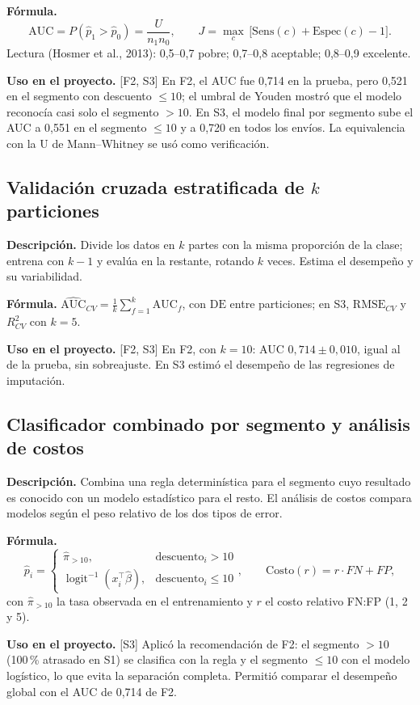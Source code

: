 \documentclass[11pt,a4paper]{article}
\newcommand{\desc}{\textbf{Descripción.} }
\newcommand{\formula}{\textbf{Fórmula.} }
\newcommand{\uso}{\textbf{Uso en el proyecto.} }
\newcommand{\fase}[1]{{\footnotesize\color{gris}[#1]}}
\begin{document}
\formula
\[
\mathrm{AUC}=P(\hat p_{1}>\hat p_{0})=\frac{U}{n_1n_0},\qquad J=\max_c\,\big[\text{Sens}(c)+\text{Espec}(c)-1\big].
\]
Lectura (Hosmer et al., 2013): 0,5--0,7 pobre; 0,7--0,8 aceptable; 0,8--0,9 excelente.

\uso \fase{F2, S3} En F2, el AUC fue 0,714 en la prueba, pero 0,521 en el segmento con descuento $\le10$; el umbral de Youden mostró que el modelo reconocía casi solo el segmento $>10$. En S3, el modelo final por segmento sube el AUC a 0,551 en el segmento $\le10$ y a 0,720 en todos los envíos. La equivalencia con la U de Mann--Whitney se usó como verificación.

\subsection{Validación cruzada estratificada de $k$ particiones}
\desc Divide los datos en $k$ partes con la misma proporción de la clase; entrena con $k-1$ y evalúa en la restante, rotando $k$ veces. Estima el desempeño y su variabilidad.

\formula $\widehat{\mathrm{AUC}}_{CV}=\frac1k\sum_{f=1}^k\mathrm{AUC}_f$, con $\mathrm{DE}$ entre particiones; en S3, $\mathrm{RMSE}_{CV}$ y $R^2_{CV}$ con $k=5$.

\uso \fase{F2, S3} En F2, con $k=10$: AUC $0{,}714\pm0{,}010$, igual al de la prueba, sin sobreajuste. En S3 estimó el desempeño de las regresiones de imputación.

\subsection{Clasificador combinado por segmento y análisis de costos}
\desc Combina una regla determinística para el segmento cuyo resultado es conocido con un modelo estadístico para el resto. El análisis de costos compara modelos según el peso relativo de los dos tipos de error.

\formula
\[
\hat p_i=\begin{cases}\hat\pi_{>10}, & \text{descuento}_i>10\\ \operatorname{logit}^{-1}(x_i^\top\hat\beta), & \text{descuento}_i\le10\end{cases},\qquad \text{Costo}(r)=r\cdot FN+FP,
\]
con $\hat\pi_{>10}$ la tasa observada en el entrenamiento y $r$ el costo relativo FN:FP (1, 2 y 5).

\uso \fase{S3} Aplicó la recomendación de F2: el segmento $>10$ (100\,\% atrasado en S1) se clasifica con la regla y el segmento $\le10$ con el modelo logístico, lo que evita la separación completa. Permitió comparar el desempeño global con el AUC de 0,714 de F2.
\end{document}
